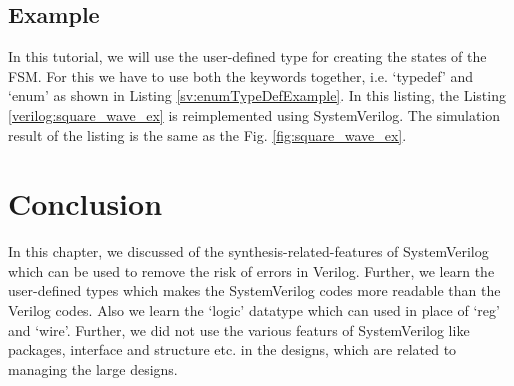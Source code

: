 \subsection{Example} \label{sec:enumTypeDefExample}
In this tutorial, we will use the user-defined type for creating the states of the FSM. For this we have to use both the keywords together, i.e. `typedef' and `enum' as shown in Listing \ref{sv:enumTypeDefExample}. In this listing, the Listing \ref{verilog:square_wave_ex} is reimplemented using SystemVerilog. The simulation result of the listing is the same as the Fig. \ref{fig:square_wave_ex}. 




\section{Conclusion}
In this chapter, we discussed of the synthesis-related-features of SystemVerilog which can be used to remove the risk of errors in Verilog. Further, we learn the user-defined types which makes the SystemVerilog codes more readable than the Verilog codes. Also we learn the `logic' datatype which can used in place of `reg' and `wire'. Further, we did not use the various featurs of SystemVerilog like packages, interface and structure etc. in the designs, which are related to managing the large designs.